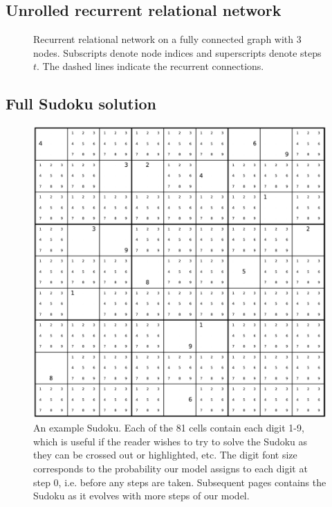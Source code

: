 \subsection{Unrolled recurrent relational network}

\begin{figure}[!ht]
\centering

\caption*{Recurrent relational network on a fully connected graph with 3 nodes. Subscripts denote node indices and superscripts denote steps $t$. The dashed lines indicate the recurrent connections. \label{fig:unrolled}}
\end{figure}

\subsection{Full Sudoku solution}
\begin{figure}
	\caption*{An example Sudoku. Each of the 81 cells contain each digit 1-9, which is useful if the reader wishes to try to solve the Sudoku as they can be crossed out or highlighted, etc. The digit font size corresponds to the probability our model assigns to each digit at step 0, i.e. before any steps are taken. Subsequent pages contains the Sudoku as it evolves with more steps of our model.}
	\centering
	\includegraphics[width=1.0\textwidth]{figures/full/000-00.pdf}
\end{figure}

